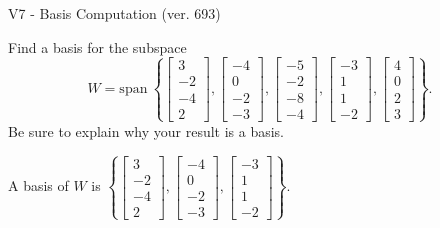 \begin{exercise}
  \begin{exerciseTitle}V7 - Basis Computation (ver. 693)\end{exerciseTitle}
  \begin{exerciseStatement}
    Find a basis for the subspace 
\[W=\mathrm{span}\ \left\{\left[\begin{array}{r}
3 \\
-2 \\
-4 \\
2
\end{array}\right] , \left[\begin{array}{r}
-4 \\
0 \\
-2 \\
-3
\end{array}\right] , \left[\begin{array}{r}
-5 \\
-2 \\
-8 \\
-4
\end{array}\right] , \left[\begin{array}{r}
-3 \\
1 \\
1 \\
-2
\end{array}\right] , \left[\begin{array}{r}
4 \\
0 \\
2 \\
3
\end{array}\right]\right\}.\]
 Be sure to explain why your result is a basis.


  \end{exerciseStatement}
  \begin{exerciseAnswer}
   A basis of \(W\) is  \(\left\{\left[\begin{array}{r}
3 \\
-2 \\
-4 \\
2
\end{array}\right] , \left[\begin{array}{r}
-4 \\
0 \\
-2 \\
-3
\end{array}\right] , \left[\begin{array}{r}
-3 \\
1 \\
1 \\
-2
\end{array}\right]\right\}\).
  


  \end{exerciseAnswer}
\end{exercise}